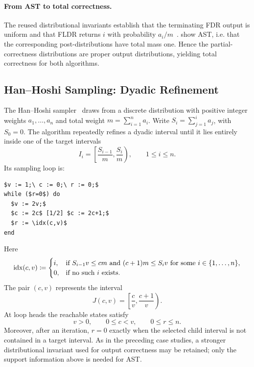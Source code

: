 \paragraph{From AST to total correctness.}
The reused distributional invariants establish that the terminating FDR output is uniform and that FLDR returns $i$ with probability $a_i/m$~\cite{zilken2026verifyingsamplingalgorithmsdistributional}.  show AST, i.e. that the corresponding post-distributions have total mass one. Hence the partial-correctness distributions are proper output distributions, yielding total correctness for both algorithms.



\subsection{Han--Hoshi Sampling: Dyadic Refinement}
\label{sec:HanHoshi}

The Han--Hoshi sampler~\cite{HanHoshi1997} draws from a discrete distribution with positive
integer weights $a_1,\ldots,a_n$ and total weight
$m=\sum_{i=1}^n a_i$.  Write $S_i=\sum_{j=1}^i a_j$, with $S_0=0$.
The algorithm repeatedly refines a dyadic interval until it lies entirely
inside one of the target intervals
\[
 I_i=\left[\frac{S_{i-1}}m,\frac{S_i}m\right),
 \qquad 1\le i\le n.
\]
Its sampling loop is:
\begin{lstlisting}[basicstyle=\ttfamily\small,mathescape=true,frame=single]
$v := 1;\ c := 0;\ r := 0;$
while ($r=0$) do
  $v := 2v;$
  $c := 2c$ [1/2] $c := 2c+1;$
  $r := \idx(c,v)$
end
\end{lstlisting}
Here
\[
 \textnormal{idx}(c,v)
 \coloneqq
 \begin{cases}
 i,
 & \text{if }S_{i-1}v\le cm\text{ and }(c+1)m\le S_iv
   \text{ for some }i\in\{1,\ldots,n\},\\
 0,&\text{if no such }i\text{ exists}.
 \end{cases}
\]
The pair $(c,v)$ represents the interval
\[
 J(c,v)=\left[\frac cv,\frac{c+1}v\right).
\]
At loop heads the reachable states satisfy
\begin{equation}
 v>0,\qquad 0\le c<v,\qquad 0\le r\le n.
 \label{eq:han-hoshi-support}
\end{equation}
Moreover, after an iteration, $r=0$ exactly when the selected child
interval is not contained in a target interval.  As in the preceding case
studies, a stronger distributional invariant used for output correctness
may be retained; only the support information above is needed for AST.

